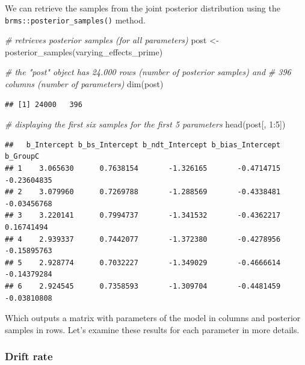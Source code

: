\documentclass[
  11pt,
  english,
  ,doc,floatsintext]{apa6}
\newenvironment{Shaded}{}{}
\newcommand{\CommentTok}[1]{\textcolor[rgb]{0.38,0.63,0.69}{\textit{#1}}}
\newcommand{\DecValTok}[1]{\textcolor[rgb]{0.25,0.63,0.44}{#1}}
\newcommand{\FunctionTok}[1]{\textcolor[rgb]{0.02,0.16,0.49}{#1}}
\newcommand{\NormalTok}[1]{#1}
\newcommand{\OtherTok}[1]{\textcolor[rgb]{0.00,0.44,0.13}{#1}}
\newcommand{\SpecialCharTok}[1]{\textcolor[rgb]{0.25,0.44,0.63}{#1}}
\begin{document}
We can retrieve the samples from the joint posterior distribution using the \texttt{brms::posterior\_samples()} method.

\begin{Shaded}
\begin{Highlighting}[]
\CommentTok{\# retrieves posterior samples (for all parameters)}
\NormalTok{post }\OtherTok{\textless{}{-}} \FunctionTok{posterior\_samples}\NormalTok{(varying\_effects\_prime)}

\CommentTok{\# the "post" object has 24.000 rows (number of posterior samples) and}
\CommentTok{\# 396 columns (number of parameters)}
\FunctionTok{dim}\NormalTok{(post)}
\end{Highlighting}
\end{Shaded}

\begin{verbatim}
## [1] 24000   396
\end{verbatim}

\begin{Shaded}
\begin{Highlighting}[]
\CommentTok{\# displaying the first six samples for the first 5 parameters}
\FunctionTok{head}\NormalTok{(post[, }\DecValTok{1}\SpecialCharTok{:}\DecValTok{5}\NormalTok{])}
\end{Highlighting}
\end{Shaded}

\begin{verbatim}
##   b_Intercept b_bs_Intercept b_ndt_Intercept b_bias_Intercept    b_GroupC
## 1    3.065630      0.7638154       -1.326165       -0.4714715 -0.23604835
## 2    3.079960      0.7269788       -1.288569       -0.4338481 -0.03456768
## 3    3.220141      0.7994737       -1.341532       -0.4362217  0.16741494
## 4    2.939337      0.7442077       -1.372380       -0.4278956 -0.15895763
## 5    2.928774      0.7032227       -1.349029       -0.4666614 -0.14379284
## 6    2.924545      0.7358593       -1.309704       -0.4481459 -0.03810808
\end{verbatim}

Which outputs a matrix with parameters of the model in columns and posterior samples in rows. Let's examine these results for each parameter in more details.

\hypertarget{drift-rate}{%
\subsubsection{Drift rate}\label{drift-rate}}
\end{document}
